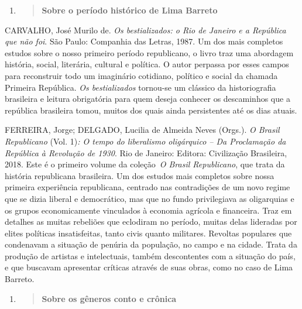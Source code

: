 \begin{enumerate}
\def\labelenumi{\arabic{enumi})}
\setcounter{enumi}{2}
\item
  \begin{quote}
  \textbf{Sobre o período histórico de Lima Barreto}
  \end{quote}
\end{enumerate}

CARVALHO, José Murilo de. \emph{Os bestializados: o Rio de Janeiro e a
República que não foi}. São Paulo: Companhia das Letras, 1987. Um dos
mais completos estudos sobre o nosso primeiro período republicano, o
livro traz uma abordagem história, social, literária, cultural e
política. O autor perpassa por esses campos para reconstruir todo um
imaginário cotidiano, político e social da chamada Primeira República.
\emph{Os bestializados} tornou-se um clássico da historiografia
brasileira e leitura obrigatória para quem deseja conhecer os
descaminhos que a república brasileira tomou, muitos dos quais ainda
persistentes até os dias atuais.

FERREIRA, Jorge; DELGADO, Lucilia de Almeida Neves (Orgs.). \emph{O
Brasil Republicano} (Vol. 1)\emph{: O tempo do liberalismo oligárquico
-- Da Proclamação da República à Revolução de 1930}. Rio de Janeiro:
Editora: Civilização Brasileira, 2018. Este é o primeiro volume da
coleção~\emph{O Brasil Republicano}, que trata da história republicana
brasileira. Um dos estudos mais completos sobre nossa primeira
experiência republicana, centrado nas contradições de um novo regime que
se dizia liberal e democrático, mas que no fundo privilegiava as
oligarquias e os grupos economicamente vinculados à economia agrícola e
financeira. Traz em detalhes as muitas rebeliões que eclodiram no
período, muitas delas lideradas por elites políticas insatisfeitas,
tanto civis quanto militares. Revoltas populares que condenavam a
situação de penúria da população, no campo e na cidade. Trata da
produção de artistas e intelectuais, também descontentes com a situação
do país, e que buscavam apresentar críticas através de suas obras, como
no caso de Lima Barreto.

\begin{enumerate}
\def\labelenumi{\arabic{enumi})}
\setcounter{enumi}{3}
\item
  \begin{quote}
  \textbf{Sobre os gêneros conto e crônica}
  \end{quote}
\end{enumerate}

